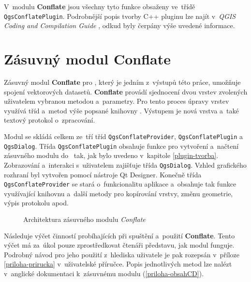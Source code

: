 V~modulu \textbf{Conflate} jsou všechny tyto funkce obsaženy ve~třídě
\texttt{Qgs\-Con\-flate\-Plugin}. 
Podrobnější popis tvorby C++ pluginu lze najít v~\textit{QGIS Coding and 
Compilation Guide} \cite{qgisCCguide}, odkud byly čerpány výše uvedené 
informace.



\section{Zásuvný modul Conflate}
\label{plugin-navrh}

Zásuvný modul \textbf{Conflate} pro , který je jedním z~výstupů této
práce, umožňuje spojení vektorových datasetů. \textbf{Conflate} provádí 
sjednocení dvou vrstev zvolených uživatelem vybranou metodou a~parametry. Pro 
tento proces úpravy vrstev využívá tříd a~metod výše popsané knihovny . 
Výstupem je nová vrstva a~také textový protokol o~zpracování.

Modul se skládá celkem ze~tří tříd \texttt{QgsConflateProvider}, 
\texttt{QgsConflatePlugin} a~ \texttt{QgsDialog}. Třída \texttt{QgsConflatePlugin} 
obsahuje funkce pro vytvoření a~načtení zásuvného modulu do~ tak, jak 
bylo uvedeno v~kapitole \ref{plugin-tvorba}. Zobrazování a~interakci s~uživatelem 
zajišťuje třída \texttt{QgsDialog}. Vzhled grafického rozhraní byl vytvořen 
pomocí nástroje Qt Designer. Konečně třída \texttt{QgsConflateProvider} 
se stará o~funkcionalitu aplikace a~obsahuje tak funkce využívající knihovnu 
 a~další metody pro kopírování vrstvy, změnu geometrie, výpis 
protokolu apod.

\vspace{0.5cm}
\label{schema}
  \begin{figure}[h]
    \centering
      
      \caption{Architektura zásuvného modulu \textit{Conflate}}
      \label{fig:schema}
  \end{figure} 

Následuje výčet činností probíhajících při spuštění a~použití \textbf{Conflate}.
Tento výčet má za~úkol pouze zprostředkovat čtenáři představu, jak modul funguje.
Podrobný návod pro jeho použití z~hlediska uživatele je pak rozepsán v~příloze
\ref{priloha-prirucka} v~uživatelské příručce. Popis jednotlivých metod
lze nalézt v~anglické dokumentaci k~zásuvnému modulu (\ref{priloha-obsahCD}).

